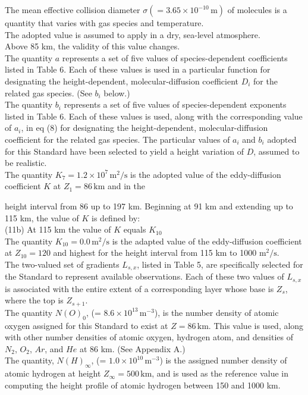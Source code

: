 \documentclass{article}
\begin{document}
The mean effective collision diameter \(\sigma (= 3.65 \times 10^{-10} \, \mathrm{m})\) of molecules is a quantity that varies with gas species and temperature.\\
The adopted value is assumed to apply in a dry, sea-level atmosphere.\\
Above 85 km, the validity of this value changes.\\

\noindent The quantity \(a\) represents a set of five values of species-dependent coefficients listed in Table 6. Each of these values is used in a particular function for designating the height-dependent, molecular-diffusion coefficient \(D_i\) for the related gas species. (See \(b_i\) below.)\\
\noindent The quantity \(b_i\) represents a set of five values of species-dependent exponents listed in Table 6. Each of these values is used, along with the corresponding value of \(a_i\), in eq (8) for designating the height-dependent, molecular-diffusion coefficient for the related gas species. The particular values of \(a_i\) and \(b_i\) adopted for this Standard have been selected to yield a height variation of \(D\), assumed to be realistic.\\
The quantity \(K_7 = 1.2 \times 10^7 \, \mathrm{m^2/s}\) is the adopted value of the eddy-diffusion coefficient \(K\) at \(Z_1 = 86 \, \mathrm{km}\) and in the

height interval from 86 up to 197 km. Beginning at 91 km and extending up to 115 km, the value of \(K\) is defined by:\\
(11b) At 115 km the value of \(K\) equals \(K_{10}\)\\
The quantity \(K_{10} = 0.0 \, \text{m}^2/\text{s}\) is the adapted value of the eddy-diffusion coefficient at \(Z_{10} = 120\) and highest for the height interval from 115 km to 1000 \( \text{m}^2/\text{s}\).\\
The two-valued set of gradients \(L_{s,x}\), listed in Table 5, are specifically selected for the Standard to represent available observations. Each of these two values of \(L_{s,x}\) is associated with the entire extent of a corresponding layer whose base is \(Z_s\), where the top is \(Z_{s+1}\).\\
The quantity \(N(O)_0\), (= \(8.6 \times 10^{13} \, \text{m}^{-3}\)), is the number density of atomic oxygen assigned for this Standard to exist at \(Z = 86 \, \text{km}\). This value is used, along with other number densities of atomic oxygen, hydrogen atom, and densities of \(N_2\), \(O_2\), \(Ar\), and \(He\) at 86 km. (See Appendix A.)\\
The quantity, \(N(H)_\infty\), (= \(1.0 \times 10^{10} \, \text{m}^{-3}\)) is the assigned number density of atomic hydrogen at height \(Z_\infty = 500 \, \text{km}\), and is used as the reference value in computing the height profile of atomic hydrogen between 150 and 1000 km.\\
\end{document}
